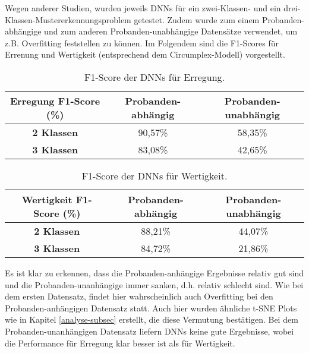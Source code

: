 

Wegen anderer Studien, wurden jeweils DNNs für ein zwei-Klassen- und ein drei-Klassen-Mustererkennungsproblem getestet.
Zudem wurde zum einem Probanden-abhängige und zum anderen Probanden-unabhängige Datensätze verwendet, um z.B. Overfitting feststellen zu können.
Im Folgendem sind die F1-Scores für Errenung und Wertigkeit (entsprechend dem Circumplex-Modell) vorgestellt. \\ 


\begin{table}[H] \centering
\begin{tabular}{|c|c|c|}
\hline
\textbf{Erregung F1-Score (\%)} & \textbf{Probanden-abhängig} & \textbf{Probanden-unabhängig} \\ \hline
\textbf{2 Klassen} & 90,57\% & 58,35\% \\ \hline
\textbf{3 Klassen} & 83,08\% & 42,65\% \\ \hline
\end{tabular} \vspace{0.2cm}
\caption{ F1-Score der DNNs für Erregung. } \end{table}



\begin{table}[H] \centering
\begin{tabular}{|c|c|c|}
\hline
\textbf{Wertigkeit F1-Score (\%)} & \textbf{Probanden-abhängig} & \textbf{Probanden-unabhängig} \\ \hline
\textbf{2 Klassen} & 88,21\% & 44,07\% \\ \hline
\textbf{3 Klassen} & 84,72\% & 21,86\% \\ \hline
\end{tabular} \vspace{0.2cm}
\caption{ F1-Score der DNNs für Wertigkeit. } \end{table}


Es ist klar zu erkennen, dass die Probanden-anhängige Ergebnisse relativ gut sind und die Probanden-unanhängige immer sanken, d.h. relativ schlecht sind. 
Wie bei dem ersten Datensatz, findet hier wahrscheinlich auch Overfitting bei den Probanden-anhängigen Datensatz statt.
Auch hier wurden ähnliche t-SNE Plots wie in Kapitel \ref{analyse-subsec} erstellt, die diese Vermutung bestätigen. 
Bei dem Probanden-unanhängigen Datensatz liefern DNNs keine gute Ergebnisse, wobei die Performance für Erregung klar besser ist als für Wertigkeit. 
